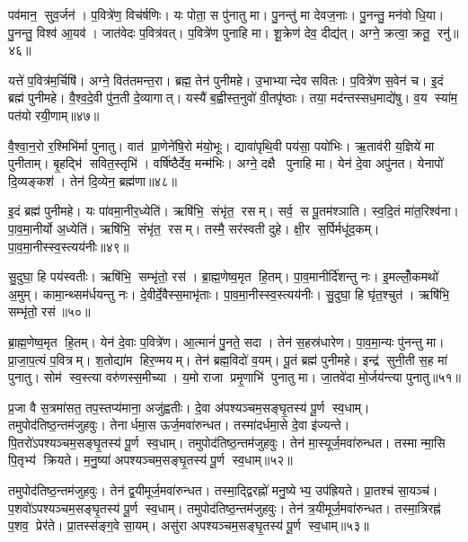 पव॑मान॒ सुव॒र्जन॑। प॒वित्रे॑ण॒ विच॑र्\mbox{}षणिः। यः पोता॒ स पु॑नातु मा। पु॒नन्तु॑ मा देवज॒नाः। पु॒नन्तु॒ मन॑वो धि॒या। पु॒नन्तु॒ विश्व॑ आ॒यव॑। जात॑वेदः प॒वित्र॑वत्। प॒वित्रे॑ण पुनाहि मा। शू॒क्रेण॑ देव॒ दीद्य॑त्। अग्ने॒ क्रत्वा॒ क्रतू॒ रनु॑॥४६॥

यत्ते॑ प॒वित्र॑म॒र्चिषि॑। अग्ने॒ वित॑तमन्त॒रा। ब्रह्म॒ तेन॑ पुनीमहे। उ॒भाभ्यान्देव सवितः। प॒वित्रे॑ण स॒वेन॑ च। इ॒दं ब्रह्म॑ पुनीमहे। वै॒श्व॒दे॒वी पु॑न॒ती दे॒व्यागात्। यस्यै॑ ब॒ह्वीस्त॒नुवो॑ वी॒तपृ॑ष्ठाः। तया॒ मद॑न्तस्सध॒माद्ये॑षु। व॒य स्या॑म॒ पत॑यो रयी॒णाम्॥४७॥

वै॒श्वा॒न॒रो र॒श्मिभि॑र्मा पुनातु। वात॑ प्रा॒णेने॑षि॒रो म॑यो॒भूः। द्यावा॑पृथि॒वी पय॑सा॒ पयो॑भिः। ऋ॒ताव॑री य॒ज्ञिये॑ मा पुनीताम्। बृ॒हद्भि॑ सवित॒स्तृभि॑। वर्\mbox{}षि॑ष्ठैर्देव॒ मन्म॑भिः। अग्ने॒ दक्षै पुनाहि मा। येन॑ दे॒वा अपु॑नत। येनापो॑ दि॒व्यङ्कश॑। तेन॑ दि॒व्येन॒ ब्रह्म॑णा॥४८॥

इ॒दं ब्रह्म॑ पुनीमहे। यः पा॑वमा॒नीर॒ध्येति॑। ऋषि॑भि॒ संभृ॑त॒ रसम्। सर्व॒ स पू॒तम॑श्ञाति। स्व॒दि॒तं मा॑त॒रिश्व॑ना। पा॒व॒मा॒नीर्यो अ॒ध्येति॑। ऋषि॑भि॒ संभृ॑त॒ रसम्। तस्मै॒ सर॑स्वती दुहे। क्षी॒र स॒र्पिर्मधू॑द॒कम्। पा॒व॒मा॒नीस्स्व॒स्त्यय॑नीः॥४९॥

सु॒दुघा॒ हि पय॑स्वतीः। ऋषि॑भि॒ सम्भृ॑तो॒ रस॑। ब्रा॒ह्म॒णेष्व॒मृत हि॒तम्। पा॒व॒मानीर्दि॑शन्तु नः। इ॒मल्लोँ॒कमथो॑ अ॒मुम्। कामा॒न्थ्सम॑र्धयन्तु नः। दे॒वीर्दे॒वैस्स॒माभृ॑ताः। पा॒व॒मा॒नीस्स्व॒स्त्यय॑नीः। सु॒दुघा॒ हि घृ॑त॒श्चुत॑। ऋषि॑भि॒ सम्भृ॑तो॒ रस॑॥५०॥

ब्रा॒ह्म॒णेष्व॒मृत हि॒तम्। येन॑ दे॒वाः प॒वित्रे॑ण। आ॒त्मानं॑ पु॒नते॒ सदा। तेन॑ स॒हस्र॑धारेण। पा॒व॒मा॒न्यः पु॑नन्तु मा। प्रा॒जा॒प॒त्यं प॒वित्रम्। श॒तोद्या॑म हिर॒ण्मयम्। तेन॑ ब्रह्म॒विदो॑ व॒यम्। पू॒तं ब्रह्म॑ पुनीमहे। इन्द्र॑ सुनी॒ती स॒ह मा॑ पुनातु। सोम॑ स्व॒स्त्या वरु॑णस्स॒मीच्या। य॒मो राजा प्रमृ॒णाभि॑ पुनातु मा। जा॒तवे॑दा मो॒र्जय॑न्त्या पुनातु॥५१॥\anuvakamend[अनु॑ रयी॒णां ब्रह्म॑णा स्व॒स्त्यय॑नीस्सु॒दुघा॒ हि घृ॑त॒श्चुत॒ ऋषि॑भि॒ सम्भृ॑तो॒ रस॑ पुनातु॒ त्रीणि॑ च]

प्र॒जा वै स॒त्रमा॑सत॒ तप॒स्तप्य॑माना॒ अजु॑ह्वतीः। दे॒वा अ॑पश्यञ्चम॒सङ्घृ॒तस्य॑ पू॒र्ण स्व॒धाम्। तमुपोद॑तिष्ठ॒न्तम॑जुहवुः। तेनार्धमा॒स ऊर्ज॒मवा॑रुन्धत। तस्मा॑दर्धमा॒से दे॒वा इ॑ज्यन्ते। पि॒तरो॑ऽपश्यञ्चम॒सङ्घृ॒तस्य॑ पू॒र्ण स्व॒धाम्। तमुपोद॑तिष्ठ॒न्तम॑जुहवुः। तेन॑ मा॒स्यूर्ज॒मवा॑रुन्धत। तस्मान्मा॒सि पि॒तृभ्य॑ क्रियते। म॒नु॒ष्या॑ अपश्यञ्चम॒सङ्घृ॒तस्य॑ पू॒र्ण स्व॒धाम्॥५२॥

तमुपोद॑तिष्ठ॒न्तम॑जुहवुः। तेन॑ द्व॒यीमूर्ज॒मवा॑रुन्धत। तस्मा॒द्द्विरह्नो॑ मनु॒ष्येभ्य॒ उप॑ह्रियते। प्रा॒तश्च॑ सा॒यञ्च॑। प॒शवो॑ऽपश्यञ्चम॒सङ्घृ॒तस्य॑ पू॒र्ण स्व॒धाम्। तमुपोद॑तिष्ठ॒न्तम॑जुहवुः। तेन॑ त्र॒यीमूर्ज॒मवा॑रुन्धत। तस्मा॒त्रिरह्न॑ प॒शव॒ प्रेर॑ते। प्रा॒तस्स॑ङ्ग॒वे सा॒यम्। असु॑रा अपश्यञ्चम॒सङ्घृ॒तस्य॑ पू॒र्ण स्व॒धाम्॥५३॥

